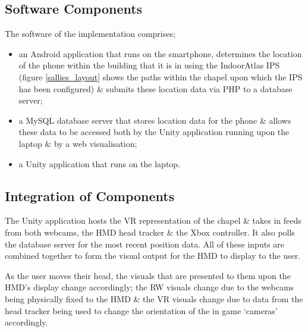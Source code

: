 

\subsection{Software Components}
The software of the implementation comprises;

\begin{itemize}
	\item an Android application that runs on the smartphone, determines the location of the phone within the building that it is in using the IndoorAtlas IPS~\cite{IndoorAtlasLtd.2012} (figure \ref{sallies_layout} shows the paths within the chapel upon which the IPS has been configured) \& submits these location data via PHP to a database server;
	\item a MySQL database server that stores location data for the phone \& allows these data to be accessed both by the Unity application running upon the laptop \& by a web visualisation;
	\item a Unity application that runs on the laptop.
\end{itemize}


\subsection{Integration of Components}
The Unity application hosts the VR representation of the chapel \& takes in feeds from both webcams, the HMD head tracker \& the Xbox controller. It also polls the database server for the most recent position data. All of these inputs are combined together to form the visual output for the HMD to display to the user.

As the user moves their head, the visuals that are presented to them upon the HMD's display change accordingly; the RW visuals change due to the webcams being physically fixed to the HMD \& the VR visuals change due to data from the head tracker being used to change the orientation of the in game `cameras' accordingly.


